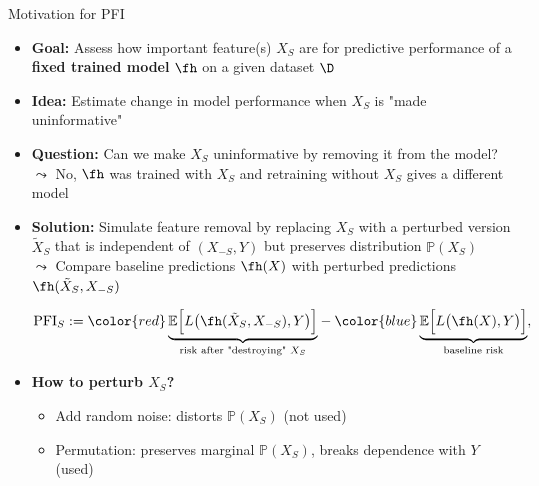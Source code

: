 \documentclass[11pt,compress,t,notes=noshow, aspectratio=169, xcolor=table]{beamer}
\begin{document}



\begin{frame}{Motivation for PFI}


\begin{itemize}
  \item<1-> \textbf{Goal:} Assess how important feature(s) $X_S$ are for predictive performance of a \textbf{fixed trained model} $\fh$ on a given dataset $\D$
  \item<1-> \textbf{Idea:} Estimate change in model performance when $X_S$ is "made uninformative"
  \item<2-> \textbf{Question:} Can we make $X_S$ uninformative by removing it from the model?\\
  $\leadsto$ No, $\fh$ was trained with $X_S$ and retraining without $X_S$ gives a  different model
  \item<3-> 
\textbf{Solution:} Simulate feature removal by replacing $X_S$ with a perturbed version $\tilde{X}_S$ that is independent of $(X_{-S}, Y)$ but preserves distribution $\mathbb{P}(X_S)$\\
  $\leadsto$ Compare {\color{blue}baseline predictions $\fh(X)$} with {\color{red}perturbed predictions $\fh(\tilde{X}_S, X_{-S})$}
  
  

\[
\text{PFI}_S :=
 {\color{red}\underbrace{\mathbb{E}\Big[L\big(\fh(\tilde{X}_S, X_{-S}), Y\big)\Big]}_{\text{risk after "destroying" }X_S}}
 -
 {\color{blue}\underbrace{\mathbb{E}\Big[L\big(\fh(X), Y\big)\Big]}_{\text{baseline risk}}},
\]
  \item<3-> \textbf{How to perturb $X_S$?}
  \begin{itemize}
    \item Add random noise: distorts $\mathbb{P}(X_S)$ (not used)
    \item Permutation: preserves marginal $\mathbb{P}(X_S)$, breaks dependence with $Y$ (used)
  \end{itemize}


\end{itemize}
\end{frame}
\end{document}
